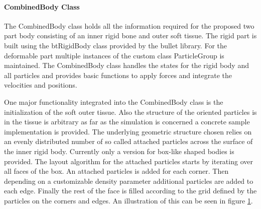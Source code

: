 \paragraph{CombinedBody Class}
The CombinedBody class holds all the information required for the proposed two part body consisting of an inner rigid bone and outer soft tissue. The rigid part is built using the btRigidBody class provided by the bullet library. For the deformable part multiple instances of the custom class ParticleGroup is maintained. The CombinedBody class handles the states for the rigid body and all particles and provides basic functions to apply forces and integrate the velocities and positions.

One major functionality integrated into the CombinedBody class is the initialization of the soft outer tissue. Also the structure of the oriented particles is in the tissue is arbitrary as far as the simulation is concerned a concrete sample implementation is provided. The underlying geometric structure chosen relies on an evenly distributed number of so called attached particles across the surface of the inner rigid body. Currently only a version for box-like shaped bodies is provided. The layout algorithm for the attached particles starts by iterating over all faces of the box. An attached particles is added for each corner. Then depending on a customizable density parameter additional particles are added to each edge. Finally the rest of the face is filled according to the grid defined by the particles on the corners and edges. An illustration of this can be seen in figure \ref{fig:combined_body_density}.

\begin{figure}[htbp]
  \centering
\hspace{2cm}
  \label{fig:combined_body_density}
\end{figure}

